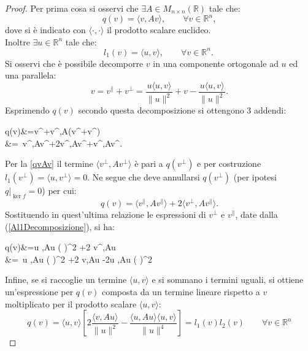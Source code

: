 \begin{proof}
    Per prima cosa si osservi che $\exists A\in M_{n\times n}(\mathbb{R} )$ tale che:
    \begin{equation}
        q(v)=\langle v,Av\rangle,\qquad \forall v\in\mathbb{R}^n,\label{qvAv}
    \end{equation}
    dove si è indicato con $\langle \cdot ,\cdot \rangle$ il prodotto scalare euclideo.\\Inoltre $\exists u\in\mathbb{R}^n$ tale che:
    \begin{equation}
        l_1(v)=\langle u,v\rangle,\qquad \forall v\in\mathbb{R}^n.\label{luv}\
    \end{equation}
    Si osservi che è possibile decomporre $v$ in una componente ortogonale ad $u$ ed una parallela:
    \begin{equation}
        v=v^\parallel +v^\bot =\frac{u \langle u,v\rangle}{\|u\|^2}+v-\frac{u\langle u,v\rangle}{\|u\|^2}.
    \label{Al1Decomposizione}
    \end{equation}  
    Esprimendo $q(v)$ secondo questa decomposizione si ottengono 3 addendi:
    \begin{flalign*}
            q(v)&=\langle  v^\parallel +v^\bot,A(v^\parallel +v^\bot)\rangle\\
            &=\ \langle v^\parallel ,Av^\parallel \rangle+2\langle v^\bot,Av^\parallel\rangle+\langle v^\bot,Av^\bot\rangle.
    \end{flalign*}
    Per la \eqref{qvAv} il termine $\langle v^\bot,Av^\bot\rangle$ è pari a $q(v^\bot)$ e per costruzione $l_1(v^\bot)=\langle u,v^\bot\rangle=0$. Ne segue che deve annullarsi $q(v^\bot)$ (per ipotesi $q|_{\ker f}=0$) per cui:
   \begin{equation*}
    q(v)=\langle v^\parallel ,Av^\parallel \rangle+2\langle v^\bot,Av^\parallel\rangle.
   \end{equation*}
   Sostituendo in quest'ultima relazione le espressioni di $v^\bot$ e $v^\parallel$, date dalla (\ref{Al1Decomposizione}), si ha:
   \begin{flalign*}
        q(v)&=\langle u ,Au \rangle\left( \right)^2 +2 \langle v^\bot,Au\rangle {}\\
        &=\ \langle u ,Au \rangle\left( \right)^2 +2 \langle v,Au\rangle \frac{\langle u,v\rangle}{\|u\|^2} -2\langle u ,Au \rangle\left(\frac{\langle u,v\rangle}{\|u\|^2} \right)^2\\
   \end{flalign*}
   Infine, se si raccoglie un termine $\langle u,v\rangle$ e si sommano i termini uguali, si ottiene un'espressione per $q(v)$ composta da un termine lineare rispetto a $v$ moltiplicato per il prodotto scalare $\langle u,v\rangle$:
   \begin{equation}
    q(v)=\langle u,v\rangle\left[2 \frac{\langle v,Au\rangle}{\|u\|^2}-\frac{\langle u ,Au \rangle\langle u,v\rangle}{\|u\|^4} \right]=l_1(v)l_2(v) \qquad \forall v\in\mathbb{R}^n
   \end{equation}
\end{proof}
